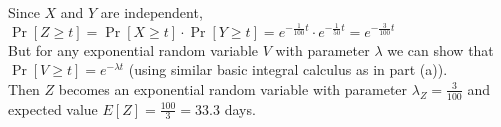 \documentclass[11pt,fleqn]{article}
\begin{document}
\begin{enumerate}
\begin{enumerate}
Since $X$ and $Y$ are independent, $\displaystyle\Pr[Z\geq t] = \Pr[X\geq t]\cdot\Pr[Y\geq t] = e^{-\frac1{100}t}\cdot e^{-\frac1{50}t} = e^{-\frac3{100}t}$ \\
But for any exponential random variable $V$ with parameter $\lambda$ we can show that $\Pr[V\geq t] = e^{-\lambda t}$ (using similar basic integral calculus as in part (a)). \\
Then $Z$ becomes an exponential random variable with parameter $\lambda_Z = \frac3{100}$ and expected value $E[Z] = \frac{100}3 = 33.3$ days.
\end{enumerate}

\end{enumerate}
\end{document}

